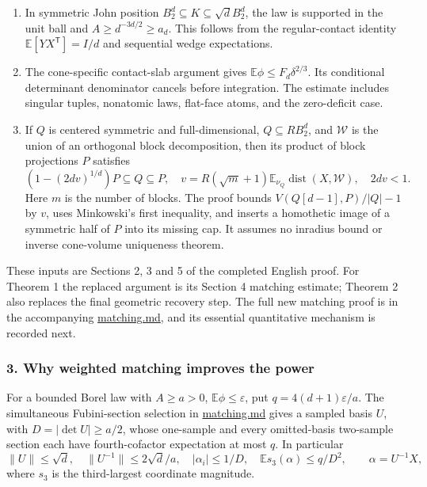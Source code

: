 \documentclass[
  11pt,
]{article}
\providecommand{\tightlist}{%
  \setlength{\itemsep}{0pt}\setlength{\parskip}{0pt}}
\begin{document}
\begin{enumerate}
\def\labelenumi{\arabic{enumi}.}
\tightlist
\item
  In symmetric John position \(B_2^d\subseteq K\subseteq\sqrt d B_2^d\),
  the law is supported in the unit ball and \(A\ge d^{-3d/2}\ge a_d\).
  This follows from the regular-contact identity
  \(\mathbb E[Y X^{\mathsf T}]=I/d\) and sequential wedge expectations.
\item
  The cone-specific contact-slab argument gives
  \(\mathbb E\phi\le F_d\delta^{2/3}\). Its conditional determinant
  denominator cancels before integration. The estimate includes singular
  tuples, nonatomic laws, flat-face atoms, and the zero-deficit case.
\item
  If \(Q\) is centered symmetric and full-dimensional,
  \(Q\subseteq RB_2^d\), and \(\mathcal W\) is the union of an
  orthogonal block decomposition, then its product of block projections
  \(P\) satisfies \[
  (1-(2dv)^{1/d})P\subseteq Q\subseteq P,
  \quad v=R(\sqrt m+1)\mathbb E_{\nu_Q}\operatorname{dist}(X,\mathcal W),
  \quad 2dv<1.                                             \tag{4}
  \] Here \(m\) is the number of blocks. The proof bounds
  \(V(Q[d-1],P)/|Q|-1\) by \(v\), uses Minkowski's first inequality, and
  inserts a homothetic image of a symmetric half of \(P\) into its
  missing cap. It assumes no inradius bound or inverse cone-volume
  uniqueness theorem.
\end{enumerate}

These inputs are Sections 2, 3 and 5 of the completed English proof. For
Theorem 1 the replaced argument is its Section 4 matching estimate;
Theorem 2 also replaces the final geometric recovery step. The full new
matching proof is in the accompanying \url{matching.md}, and its
essential quantitative mechanism is recorded next.

\subsubsection{3. Why weighted matching improves the
power}\label{why-weighted-matching-improves-the-power}

For a bounded Borel law with \(A\ge a>0\),
\(\mathbb E\phi\le\varepsilon\), put \(q=4(d+1)\varepsilon/a\). The
simultaneous Fubini-section selection in \url{matching.md} gives a
sampled basis \(U\), with \(D=|\det U|\ge a/2\), whose one-sample and
every omitted-basis two-sample section each have fourth-cofactor
expectation at most \(q\). In particular \[
\|U\|\le\sqrt d,\quad \|U^{-1}\|\le2\sqrt d/a,
\quad |\alpha_i|\le1/D,\quad
\mathbb Es_3(\alpha)\le q/D^2,\qquad\alpha=U^{-1}X,
\] where \(s_3\) is the third-largest coordinate magnitude.
\end{document}
